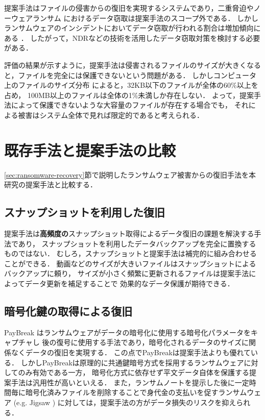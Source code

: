 提案手法はファイルの侵害からの復旧を実現するシステムであり，二重脅迫やノーウェアランサム \cite{nowhere-ransom} におけるデータ窃取は提案手法のスコープ外である．
しかしランサムウェアのインシデントにおいてデータ窃取が行われる割合は増加傾向にある \cite{sophos-report:online}．
したがって，NDRなどの技術を活用したデータ窃取対策を検討する必要がある．

評価の結果が示すように，提案手法は侵害されるファイルのサイズが大きくなると，ファイルを完全には保護できないという問題がある．
しかしコンピュータ上のファイルのサイズ分布 \cite{file-size-dist} によると，32KB以下のファイルが全体の60\%以上を占め，
100MB以上のファイルは全体の1\%未満しか存在しない．
よって，提案手法によって保護できないような大容量のファイルが存在する場合でも，
それによる被害はシステム全体で見れば限定的であると考えられる．


\section{既存手法と提案手法の比較}
\ref{sec:ransomware-recovery}節で説明したランサムウェア被害からの復旧手法を本研究の提案手法と比較する．
\subsection{スナップショットを利用した復旧}
提案手法は\textbf{高頻度の}スナップショット取得によるデータ復旧の課題を解決する手法であり，
スナップショットを利用したデータバックアップを完全に置換するものではない．
むしろ，スナップショットと提案手法は補完的に組み合わせることができる．
動画などのサイズが大きいファイルはスナップショットによるバックアップに頼り，
サイズが小さく頻繁に更新されるファイルは提案手法によってデータ更新を補足することで
効果的なデータ保護が期待できる．

\subsection{暗号化鍵の取得による復旧}
PayBreak \cite{kolodenker2017paybreak}はランサムウェアがデータの暗号化に使用する暗号化パラメータをキャプチャし
後の復号に使用する手法であり，暗号化されるデータのサイズに関係なくデータの復旧を実現する．
この点でPayBreakは提案手法よりも優れている．
しかしPayBreakは原理的に共通鍵暗号方式を採用するランサムウェアに対してのみ有効である一方，
暗号化方式に依存せず平文データ自体を保護する提案手法は汎用性が高いといえる．
また，ランサムノートを提示した後に一定時間毎に暗号化済みファイルを削除することで身代金の支払いを促すランサムウェア (e.g. Jigsaw \cite{byrne2017jigsaw})
に対しては，提案手法の方がデータ損失のリスクを抑えられる．

